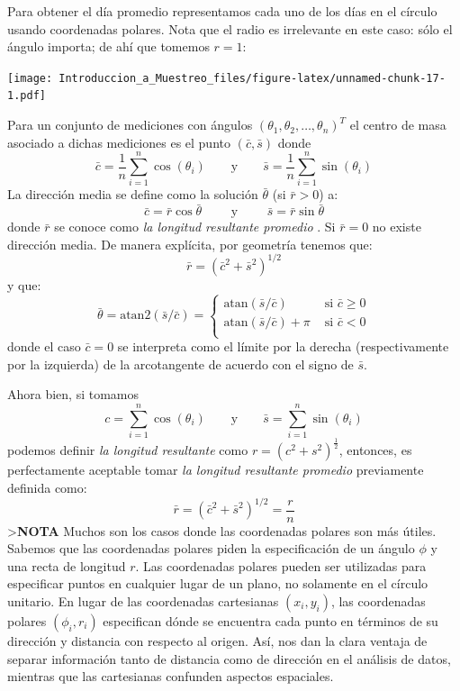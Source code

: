 \documentclass[
]{book}
\begin{document}
Para obtener el día promedio representamos cada uno de los días en el círculo usando coordenadas polares. Nota que el radio es irrelevante en este caso: sólo el ángulo importa; de ahí que tomemos \(r = 1\):

\texttt{[image: Introduccion\_a\_Muestreo\_files/figure-latex/unnamed-chunk-17-1.pdf]}

Para un conjunto de mediciones con ángulos \((\theta_1, \theta_2, \dots, \theta_n)^T\) el centro de masa asociado a dichas mediciones es el punto \((\bar{c}, \bar{s})\) donde
\[
\bar{c} = \frac{1}{n}\sum\limits_{i = 1}^n \cos (\theta_i) \qquad \text{y} \qquad \bar{s} = \frac{1}{n}\sum\limits_{i = 1}^n \sin (\theta_i)
\]
La dirección media se define como la solución \(\bar{\theta}\) (si \(\bar{r} > 0\)) a:
\[
\bar{c} = \bar{r}\cos\bar{\theta} \qquad \text{ y } \qquad \bar{s} = \bar{r}\sin\bar{\theta}
\]
donde \(\bar{r}\) se conoce como \emph{la longitud resultante promedio} . Si \(\bar{r} = 0\) no existe dirección media. De manera explícita, por geometría tenemos que:
\[
\bar{r} = (\bar{c}^2 + \bar{s}^2)^{1/2}
\]
y que:
\[
\bar{\theta} = \text{atan2}(\bar{s}/\bar{c}) = \begin{cases}
\text{atan}(\bar{s}/\bar{c}) & \text{ si } \bar{c} \geq 0\\
\text{atan}(\bar{s}/\bar{c}) + \pi & \text{ si } \bar{c} < 0\\
\end{cases}
\]
donde el caso \(\bar{c} = 0\) se interpreta como el límite por la derecha (respectivamente por la izquierda) de la arcotangente de acuerdo con el signo de \(\bar{s}\).

Ahora bien, si tomamos
\[
c=\sum\limits_{i = 1}^n \cos (\theta_i) \qquad \text{y} \qquad \bar{s} =\sum\limits_{i = 1}^n \sin (\theta_i)
\]
podemos definir \emph{la longitud resultante} como \(r=(c^2 + s^2)^{\frac{1}{2}}\), entonces, es perfectamente aceptable tomar \emph{la longitud resultante promedio} previamente definida como:
\[
\bar{r}= (\bar{c}^2 + \bar{s}^2)^{1/2} = \frac{r}{n}
\]
\textgreater{}\textbf{NOTA} Muchos son los casos donde las coordenadas polares son más útiles. Sabemos que las coordenadas polares piden la especificación de un ángulo \(\phi\) y una recta de longitud \(r\). Las coordenadas polares pueden ser utilizadas para especificar puntos en cualquier lugar de un plano, no solamente en el círculo unitario. En lugar de las coordenadas cartesianas \((x_i, y_i)\), las coordenadas polares \((\phi_i, r_i)\) especifican dónde se encuentra cada punto en términos de su dirección y distancia con respecto al origen. Así, nos dan la clara ventaja de separar información tanto de distancia como de dirección en el análisis de datos, mientras que las cartesianas confunden aspectos espaciales.
\end{document}

